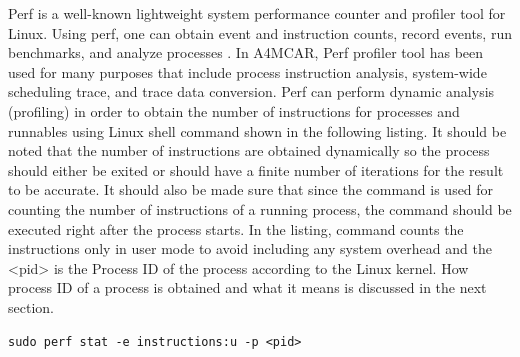 Perf \cite{perf1} \cite{perf2} is a well-known lightweight system performance counter and profiler tool for Linux. Using perf, one can obtain event and instruction counts, record events, run benchmarks, and analyze processes \cite{perf1}. In A4MCAR, Perf profiler tool has been used for many purposes that include process instruction analysis, system-wide scheduling trace, and trace data conversion. Perf can perform dynamic analysis (profiling) in order to obtain the number of instructions for processes and runnables using Linux shell command shown in the following listing. It should be noted that the number of instructions are obtained dynamically so the process should either be exited or should have a finite number of iterations for the result to be accurate. It should also be made sure that since the command is used for counting the number of instructions of a running process, the command should be executed right after the process starts. In the listing, command counts the instructions only in user mode to avoid including any system overhead and the <pid> is the Process ID of the process according to the Linux kernel. How process ID of a process is obtained and what it means is discussed in the next section.
\begin{lstlisting}[style=bash]
sudo perf stat -e instructions:u -p <pid>
\end{lstlisting}

